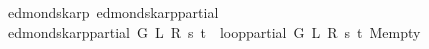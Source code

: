 \begin{isabellebody}
\isanewline
{}\isamarkupfalse%
\ {\isacharparenleft}{\kern0pt}\ edmonds{\isacharunderscore}{\kern0pt}karp{\isacharparenright}{\kern0pt}\ edmonds{\isacharunderscore}{\kern0pt}karp{\isacharunderscore}{\kern0pt}partial\ \isanewline
\ \ {\isachardoublequoteopen}edmonds{\isacharunderscore}{\kern0pt}karp{\isacharunderscore}{\kern0pt}partial\ G\ L\ R\ s\ t\ {\isasymequiv}\ loop{\isacharprime}{\kern0pt}{\isacharunderscore}{\kern0pt}partial\ G\ L\ R\ s\ t\ M{\isacharunderscore}{\kern0pt}empty{\isachardoublequoteclose}\isanewline
\isanewline
\isanewline
\isanewline
\isanewline
%
\isadelimtheory
\isanewline
%
\endisadelimtheory
%
\isatagtheory
{}\isamarkupfalse%
%
\endisatagtheory
{\isafoldtheory}%
%
\isadelimtheory
%
\endisadelimtheory
%
\end{isabellebody}%
\endinput
